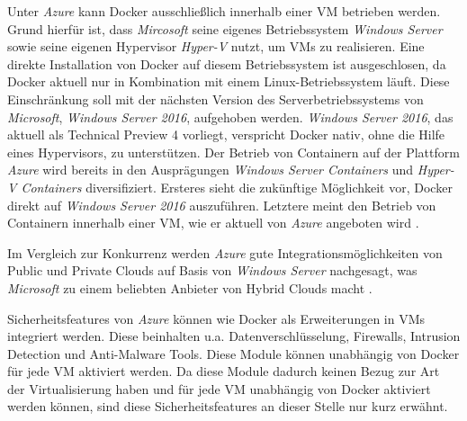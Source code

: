 \documentclass[../main.tex]{subfiles}
\begin{document}
      Unter \emph{Azure} kann Docker ausschließlich innerhalb einer VM betrieben werden. Grund hierfür ist, dass \emph{Mircosoft} seine eigenes Betriebssystem \emph{Windows Server} sowie seine eigenen Hypervisor \emph{Hyper-V} nutzt, um VMs zu realisieren. Eine direkte Installation von Docker auf diesem Betriebssystem ist ausgeschlosen, da Docker aktuell nur in Kombination mit einem Linux-Betriebssystem läuft. Diese Einschränkung soll mit der nächsten Version des Serverbetriebssystems von \emph{Microsoft}, \emph{Windows Server 2016}, aufgehoben werden. \emph{Windows Server 2016}, das aktuell als Technical Preview 4 vorliegt, verspricht Docker nativ, ohne die Hilfe eines Hypervisors, zu unterstützen. Der Betrieb von Containern auf der Plattform \emph{Azure} wird bereits in den Ausprägungen \emph{Windows Server Containers} und \emph{Hyper-V Containers} diversifiziert. Ersteres sieht die zukünftige Möglichkeit vor, Docker direkt auf \emph{Windows Server 2016} auszuführen. Letztere meint den Betrieb von Containern innerhalb einer VM, wie er aktuell von \emph{Azure} angeboten wird \cite{https://www.docker.com/microsoft}\cite{https://msdn.microsoft.com/en-us/virtualization/windowscontainers/about/about_overview}.

      Im Vergleich zur Konkurrenz werden \emph{Azure} gute Integrationsmöglichkeiten von Public und Private Clouds auf Basis von \emph{Windows Server} nachgesagt, was \emph{Microsoft} zu einem beliebten Anbieter von Hybrid Clouds macht \cite{http://www.infoworld.com/article/2887579/hybrid-cloud/ibm-embraces-docker-openstack-in-bluemix-hybrid-cloud-plans.html}.

      Sicherheitsfeatures von \emph{Azure} können wie Docker als Erweiterungen in VMs integriert werden. Diese beinhalten u.a. Datenverschlüsselung, Firewalls, Intrusion Detection und Anti-Malware Tools. Diese Module können unabhängig von Docker für jede VM aktiviert werden. Da diese Module dadurch keinen Bezug zur Art der Virtualisierung haben und für jede VM unabhängig von Docker aktiviert werden können, sind diese Sicherheitsfeatures an dieser Stelle nur kurz erwähnt.
\end{document}
